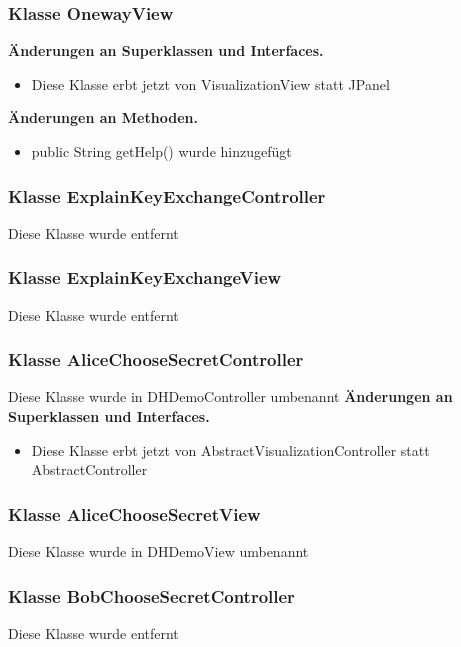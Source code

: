 \documentclass{article}
\begin{document}
	\subsubsection{Klasse OnewayView}
	    \textbf{Änderungen an Superklassen und Interfaces.}\newline
	   \begin{itemize}
            \item Diese Klasse erbt jetzt von VisualizationView statt JPanel\newline
           \end{itemize}
    \textbf{Änderungen an Methoden.}\newline
	   \begin{itemize}
           \item public String getHelp() wurde hinzugefügt\newline
           \end{itemize}

	\subsubsection{Klasse ExplainKeyExchangeController}
    Diese Klasse wurde entfernt

	\subsubsection{Klasse ExplainKeyExchangeView}
    Diese Klasse wurde entfernt

	\subsubsection{Klasse AliceChooseSecretController}
    Diese Klasse wurde in DHDemoController umbenannt
	    \textbf{Änderungen an Superklassen und Interfaces.}\newline
	   \begin{itemize}
            \item Diese Klasse erbt jetzt von AbstractVisualizationController statt AbstractController\newline
           \end{itemize}

	\subsubsection{Klasse AliceChooseSecretView}
    Diese Klasse wurde in DHDemoView umbenannt

	\subsubsection{Klasse BobChooseSecretController}
    Diese Klasse wurde entfernt
\end{document}
